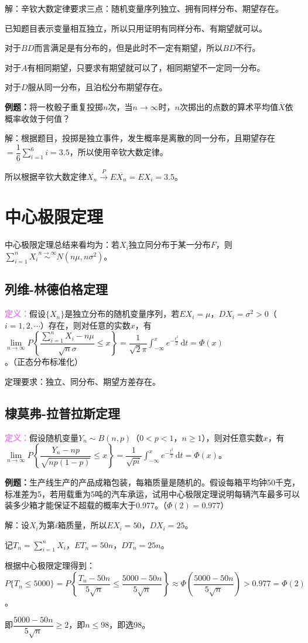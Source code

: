 \documentclass[UTF8, 12pt]{ctexart}
\begin{document}
解：辛钦大数定律要求三点：随机变量序列独立、拥有同样分布、期望存在。

已知题目表示变量相互独立，所以只用证明有同样分布、有期望就可以。

对于$BD$而言满足是有分布的，但是此时不一定有期望，所以$BD$不行。

对于$A$有相同期望，只要求有期望就可以了，相同期望不一定同一分布。

对于$D$服从同一分布，且泊松分布期望存在。

\textbf{例题：}将一枚骰子重复投掷$n$次，当$n\to\infty$时，$n$次掷出的点数的算术平均值$\overline{X}$依概率收敛于何值？

解：根据题目，投掷是独立事件，发生概率是离散的同一分布，且期望存在$=\dfrac{1}{6}\sum\limits_{i=1}^6i=3.5$，所以使用辛钦大数定律。

所以根据辛钦大数定律$\overline{X_n}\overset{P}{\rightarrow}E\overline{X_n}=EX_i=3.5$。

\section{中心极限定理}

中心极限定理总结来看均为：若$X_i$独立同分布于某一分布$F$，则$\sum\limits_{i=1}^nX_i\overset{n\to\infty}{\sim}N(n\mu,n\sigma^2)$。

\subsection{列维-林德伯格定理}

\textcolor{violet}{\textbf{定义：}}假设$\{X_n\}$是独立分布的随机变量序列，若$EX_i=\mu$，$DX_i=\sigma^2>0$（$i=1,2,\cdots$）存在，则对任意的实数$x$，有$\lim\limits_{n\to\infty}P\left\{\dfrac{\sum\limits_{i=1}^nX_i-n\mu}{\sqrt{n}\sigma}\leqslant x\right\}=\dfrac{1}{\sqrt{2}\pi}\int_{-\infty}^xe^{-\frac{t^2}{2}}\,\textrm{d}t=\varPhi(x)$。（正态分布标准化）

定理要求：独立、同分布、期望方差存在。

\subsection{棣莫弗-拉普拉斯定理}

\textcolor{violet}{\textbf{定义：}}假设随机变量$Y_n\sim B(n,p)$（$0<p<1$，$n\geqslant1$），则对任意实数$x$，有$\lim\limits_{n\to\infty}P\left\{\dfrac{Y_n-np}{\sqrt{np(1-p)}}\leqslant x\right\}=\dfrac{1}{\sqrt{pi}}\int_{-\infty}^xe^{-\frac{t^2}{2}}\,\textrm{d}t=\varPhi(x)$。\medskip

\textbf{例题：}生产线生产的产品成箱包装，每箱质量是随机的。假设每箱平均钟50千克，标准差为5，若用载重为5吨的汽车承运，试用中心极限定理说明每辆汽车最多可以装多少箱才能保证不超载的概率大于0.977。（$\varPhi(2)=0.977$）

解：设$X_i$为第$i$箱质量，所以$EX_i=50$，$DX_i=25$。

记$T_n=\sum\limits_{i=1}^nX_i$，$ET_n=50n$，$DT_n=25n$。

根据中心极限定理得到：$P\{T_n\leqslant5000\}=P\left\{\dfrac{T_n-50n}{5\sqrt{n}}\leqslant\dfrac{5000-50n}{5\sqrt{n}}\right\}\approx\varPhi\left(\dfrac{5000-50n}{5\sqrt{n}}\right)>0.977=\varPhi(2)$。

即$\dfrac{5000-50n}{5\sqrt{n}}\geqslant2$，即$n\leqslant98$，即选98。
\end{document}

